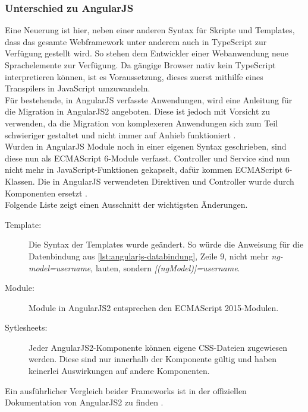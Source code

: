 \subsubsection{Unterschied zu AngularJS}

Eine Neuerung ist hier, neben einer anderen Syntax für Skripte und Templates, dass das gesamte Webframework unter anderem auch in TypeScript zur Verfügung gestellt wird. So stehen dem Entwickler einer Webanwendung neue Sprachelemente zur Verfügung. Da gängige Browser nativ kein TypeScript interpretieren können, ist es Voraussetzung, dieses zuerst mithilfe eines Transpilers in JavaScript umzuwandeln. \\
Für bestehende, in AngularJS verfasste Anwendungen, wird eine Anleitung für die Migration in AngularJS2 angeboten. Diese ist jedoch mit Vorsicht zu verwenden, da die Migration von komplexeren Anwendungen sich zum Teil schwieriger gestaltet und nicht immer auf Anhieb funktioniert \cite{Google2016}. \\
Wurden in AngularJS Module noch in einer eigenen Syntax geschrieben, sind diese nun als ECMAScript 6-Module verfasst. Controller und Service sind nun nicht mehr in JavaScript-Funktionen gekapselt, dafür kommen ECMAScript 6-Klassen. Die in AngularJS verwendeten Direktiven und Controller wurde durch Komponenten ersetzt \cite[S. 16]{Rangle.io2016}. \\
Folgende Liste zeigt einen Ausschnitt der wichtigsten Änderungen.

\begin{description}
	\item[Template:] Die Syntax der Templates wurde geändert. So würde die Anweisung für die Datenbindung aus \autoref{lst:angularjs-databindung}, Zeile 9, nicht mehr \textit{ng-model=\grqq username\grqq}, lauten, sondern \textit{[(ngModel)]=\grqq username\grqq}.
		
	\item[Module:] Module in AngularJS2 entsprechen den ECMAScript 2015-Modulen.
	
	\item[Sytlesheets:] Jeder AngularJS2-Komponente können eigene CSS-Dateien zugewiesen werden. Diese sind nur innerhalb der Komponente gültig und haben keinerlei Auswirkungen auf andere Komponenten.
\end{description}

Ein ausführlicher Vergleich beider Frameworks ist in der offiziellen Dokumentation von AngularJS2 zu finden \cite{Google2016b}.